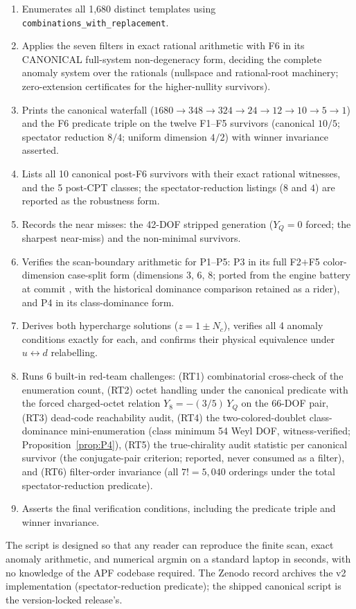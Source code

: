 \documentclass[11pt]{article}
\theoremstyle{definition}
\newcommand{\codeid}[1]{\texttt{\seqsplit{#1}}}%
\begin{document}
\begin{enumerate}[nosep,label=(\arabic*)]
  \item Enumerates all 1{,}680 distinct templates using
  \texttt{combinations\_with\_replacement}.
  \item Applies the seven filters in exact rational arithmetic with
  F6 in its CANONICAL full-system non-degeneracy form, deciding the
  complete anomaly system over the rationals (nullspace and
  rational-root machinery; zero-extension certificates for the
  higher-nullity survivors).
  \item Prints the canonical waterfall
  ($1680 \to 348 \to 324 \to 24 \to 12 \to 10 \to 5 \to 1$) and
  the F6 predicate triple on the twelve F1--F5 survivors (canonical
  $10/5$; spectator reduction $8/4$; uniform dimension $4/2$) with
  winner invariance asserted.
  \item Lists all 10 canonical post-F6 survivors with their exact
  rational witnesses, and the 5 post-CPT classes; the
  spectator-reduction listings ($8$ and $4$) are reported as the
  robustness form.
  \item Records the near misses: the 42-DOF stripped generation
  ($Y_Q = 0$ forced; the sharpest near-miss) and the non-minimal
  survivors.
  \item Verifies the scan-boundary arithmetic for P1--P5: P3 in its
  full F2$+$F5 color-dimension case-split form (dimensions 3, 6, 8;
  ported from the engine battery at commit
  \codeid{ff97524e002dcbb4101f5934cde992b5721788f7}, with the
  historical dominance comparison retained as a rider), and P4 in its
  class-dominance form.
  \item Derives both hypercharge solutions ($z = 1 \pm N_c$),
  verifies all 4 anomaly conditions exactly for each, and confirms
  their physical equivalence under $u \leftrightarrow d$ relabelling.
  \item Runs 6 built-in red-team challenges: (RT1) combinatorial
  cross-check of the enumeration count, (RT2) octet handling under
  the canonical predicate with the forced charged-octet relation
  $Y_8 = -(3/5)\,Y_Q$ on the 66-DOF pair, (RT3) dead-code
  reachability audit, (RT4) the two-colored-doublet class-dominance
  mini-enumeration (class minimum 54 Weyl DOF, witness-verified;
  Proposition~\ref{prop:P4}), (RT5) the true-chirality audit
  statistic per canonical survivor (the conjugate-pair criterion;
  reported, never consumed as a filter), and (RT6) filter-order
  invariance (all $7! = 5{,}040$ orderings under the total
  spectator-reduction predicate).
  \item Asserts the final verification conditions, including the
  predicate triple and winner invariance.
\end{enumerate}
The script is designed so that any reader can reproduce the finite
scan, exact anomaly arithmetic, and numerical argmin on a standard
laptop in seconds, with no knowledge of the APF codebase required.  The Zenodo record archives
the v2 implementation (spectator-reduction predicate); the shipped
canonical script is the version-locked release's.
\end{document}
